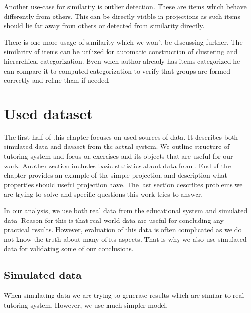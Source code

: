 \documentclass[
  digital, %
  table,   %
  nolof,     %
  nolot,     %
  nocover,
  color,
  final, %
]{fithesis3}
\begin{document}
Another use-case for similarity is outlier detection. These are items which behave differently from others. This can be directly visible in projections as such items should lie far away from others or detected from similarity directly.

There is one more usage of similarity which we won't be discussing further. The similarity of items can be utilized for automatic construction of clustering and hierarchical categorization. Even when author already has items categorized he can compare it to computed categorization to verify that groups are formed correctly and refine them if needed.


\chapter{Used dataset}\label{used-dataset}


The first half of this chapter focuses on used sources of data. It describes both simulated data and dataset from the actual system. We outline structure of tutoring system and focus on exercises and its objects that are useful for our work. Another section includes basic statistics about data from \umimeCesky{}. End of the chapter provides an example of the simple projection and description what properties should useful projection have. The last section describes problems we are trying to solve and specific questions this work tries to answer.


In our analysis, we use both real data from the educational system and simulated data. Reason for this is that real-world data are useful for concluding any practical results. However, evaluation of this data is often complicated as we do not know the truth about many of its aspects. That is why we also use simulated data for validating some of our conclusions.


\section{Simulated data}\label{simulated-data}

When simulating data we are trying to generate results which are similar to real tutoring system. However, we use much simpler model.
\end{document}
